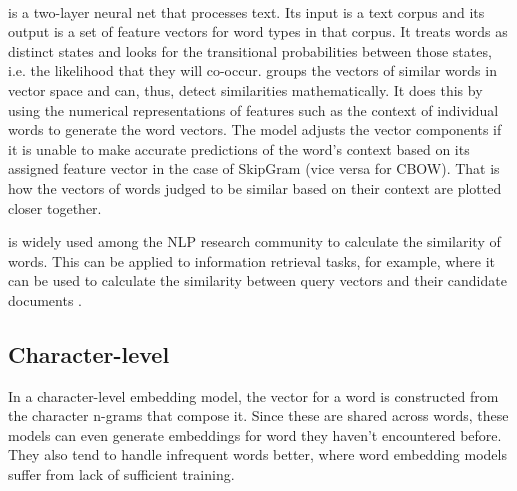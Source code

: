 \paragraph{\wordtovec} \wordtovec \citep{Mikolov2013b} is a two-layer neural net that processes text. Its input is a text corpus and its output is a set of feature vectors for word types in that corpus. It treats words as distinct states and looks for the transitional probabilities between those states, i.e. the likelihood that they will co-occur. \wordtovec groups the vectors of similar words in vector space and can, thus, detect similarities mathematically. It does this by using the numerical representations of features such as the context of individual words to generate the word vectors. The model adjusts the vector components if it is unable to make accurate predictions of the word's context based on its assigned feature vector in the case of SkipGram (vice versa for CBOW). That is how the vectors of words judged to be similar based on their context are plotted closer together.

\wordtovec is widely used among the NLP research community to calculate the similarity of words. This can be applied to information retrieval tasks, for example, where it can be used to calculate the similarity between query vectors and their candidate documents \citep{Roy2018}.

\subsection{Character-level}
In a character-level embedding model, the vector for a word is constructed from the character n-grams that compose it. Since these are shared across words, these models can even generate embeddings for word they haven't encountered before. They also tend to handle infrequent words better, where word embedding models suffer from lack of sufficient training.

